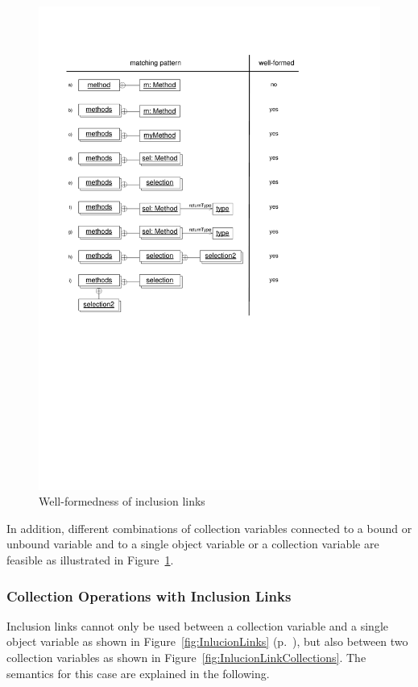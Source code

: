 \begin{figure}[htbp]
  \centering
  \includegraphics[scale=0.8]{figures/InclusionLinksWellFormedness}
  \caption{Well-formedness of inclusion links}
  \label{fig:InlucionLinkWellFormedness}
\end{figure}

In addition, different combinations of collection variables connected to a bound or unbound variable and
to a single object variable or a collection variable are feasible as illustrated in Figure~\ref{fig:InlucionLinkWellFormedness}.


\subsubsection{Collection Operations with Inclusion Links}
\label{sec:StoryPatterns:inclusion:BagsSetsEtc}

Inclusion links cannot only be used between a collection variable and a single object variable
as shown in Figure~\ref{fig:InlucionLinks} (p.~\pageref{fig:InlucionLinks}),
but also between two collection variables as shown in Figure~\ref{fig:InlucionLinkCollections}.
The semantics for this case are explained in the following.

